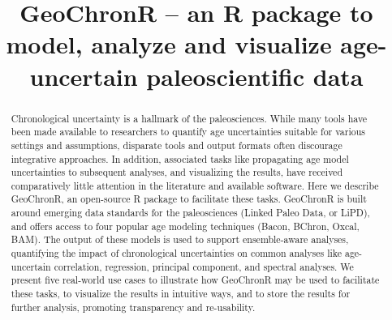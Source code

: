 \documentclass[gchron, manuscript]{copernicus}
\begin{document}
\title{GeoChronR -- an R package to model, analyze and visualize age-uncertain paleoscientific data}














\received{}
\pubdiscuss{} %
\revised{}
\accepted{}
\published{}




\maketitle


\begin{abstract}
Chronological uncertainty is a hallmark of the paleosciences. While many tools have been made available to researchers to quantify age uncertainties suitable for various settings and assumptions, disparate tools and output formats often discourage integrative approaches. In addition, associated tasks like propagating age model uncertainties to subsequent analyses, and visualizing the results, have received comparatively little attention in the literature and available software. Here we describe GeoChronR, an open-source R package to facilitate these tasks. GeoChronR is built around emerging data standards for the paleosciences (Linked Paleo Data, or LiPD), and offers access to four popular age modeling techniques (Bacon, BChron, Oxcal, BAM). The output of these models is used to support ensemble-aware analyses, quantifying the impact of chronological uncertainties on common analyses like age-uncertain correlation, regression, principal component, and spectral analyses. We present five real-world use cases to illustrate how GeoChronR may be used to facilitate these tasks, to visualize the results in intuitive ways, and to store the results for further analysis, promoting transparency and re-usability.
\end{abstract}
\end{document}
